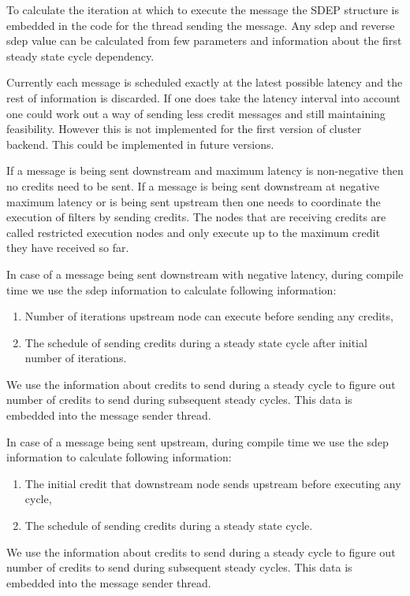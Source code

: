 To calculate the iteration at which to execute the message the SDEP
structure is embedded in the code for the thread sending the
message. Any sdep and reverse sdep value can be calculated from few
parameters and information about the first steady state cycle
dependency.

Currently each message is scheduled exactly at the latest possible
latency and the rest of information is discarded. If one does take the
latency interval into account one could work out a way of sending less
credit messages and still maintaining feasibility. However this is not
implemented for the first version of cluster backend. This could be
implemented in future versions.

If a message is being sent downstream and maximum latency is
non-negative then no credits need to be sent. If a message is being
sent downstream at negative maximum latency or is being sent upstream
then one needs to coordinate the execution of filters by sending
credits. The nodes that are receiving credits are called restricted
execution nodes and only execute up to the maximum credit they have
received so far.

In case of a message being sent downstream with negative latency,
during compile time we use the sdep information to calculate following
information:

\begin{enumerate}
\item Number of iterations upstream node can execute before sending any credits,
\item The schedule of sending credits during a steady state cycle after initial number of iterations.
\end{enumerate}

We use the information about credits to send during a steady cycle to
figure out number of credits to send during subsequent steady
cycles. This data is embedded into the message sender thread.

In case of a message being sent upstream, during compile time we use
the sdep information to calculate following information:

\begin{enumerate}
\item The initial credit that downstream node sends upstream before executing any cycle,
\item The schedule of sending credits during a steady state cycle.
\end{enumerate}

We use the information about credits to send during a steady cycle to
figure out number of credits to send during subsequent steady
cycles. This data is embedded into the message sender thread.
